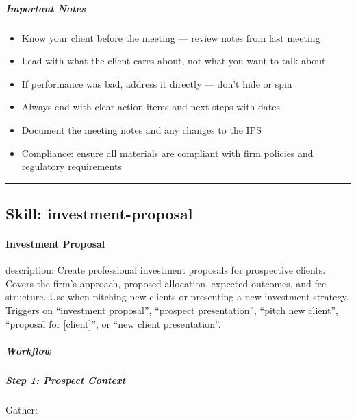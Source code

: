 \documentclass[11pt]{article}
\begin{document}
\subparagraph{Important Notes}\mbox{}\par

\begin{itemize}[leftmargin=*,itemsep=2pt,topsep=2pt]
\item {} Know your client before the meeting — review notes from last meeting
\item {} Lead with what the client cares about, not what you want to talk about
\item {} If performance was bad, address it directly — don't hide or spin
\item {} Always end with clear action items and next steps with dates
\item {} Document the meeting notes and any changes to the IPS
\item {} Compliance: ensure all materials are compliant with firm policies and regulatory requirements
\end{itemize}

\vspace{0.8em}\hrule\vspace{0.8em}

\subsection{Skill: investment-proposal}\label{file:meeting-prep-agent-skills-investment-proposal-SKILL-md}

\paragraph{Investment Proposal}\mbox{}\par

description: Create professional investment proposals for prospective clients. Covers the firm's approach, proposed allocation, expected outcomes, and fee structure. Use when pitching new clients or presenting a new investment strategy. Triggers on ``investment proposal'', ``prospect presentation'', ``pitch new client'', ``proposal for [client]'', or ``new client presentation''.


\subparagraph{Workflow}\mbox{}\par

\subparagraph{Step 1: Prospect Context}\mbox{}\par

Gather:
\end{document}
